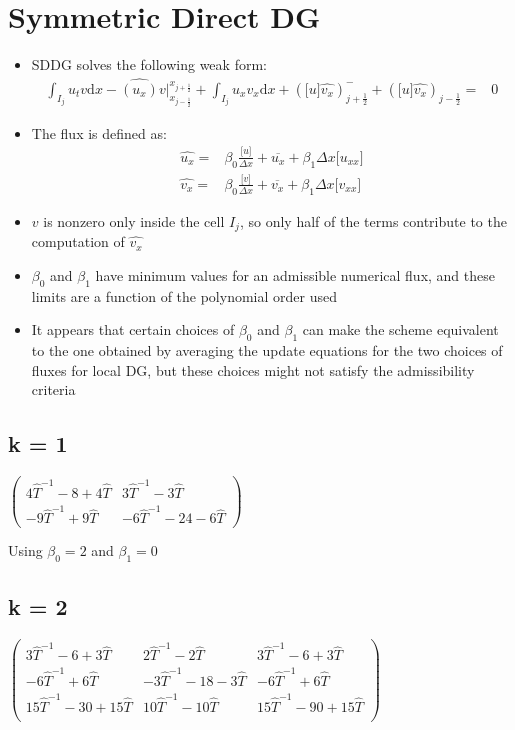 \documentclass[final]{siamltex}
\begin{document}
\section{Symmetric Direct DG}
\begin{itemize}
  \item SDDG solves the following weak form:
    \begin{align*}
      \int_{I_j} u_t v \mathrm{d}x -\widehat{(u_x)}v\bigr|_{x_{j-\frac{1}{2}}}^{x_{j+\frac{1}{2}}}+\int_{I_j} u_x v_x \mathrm{d}x+ (\lbrack u\rbrack\widehat{v_x})_{j+\frac{1}{2}}^- + (\lbrack u\rbrack \widehat{v_x} )_{j-\frac{1}{2}} = & 0
    \end{align*}
	\item The flux is defined as:
    \begin{align*}
      \widehat{u_x} = & \beta_0 \frac{\lbrack u \rbrack}{\Delta x} + \overline{u_x} + \beta_1 \Delta x \lbrack u_{xx} \rbrack\\
      \widehat{v_x} = & \beta_0 \frac{\lbrack v \rbrack}{\Delta x} + \overline{v_x} + \beta_1 \Delta x \lbrack v_{xx} \rbrack
    \end{align*}
  \item $v$ is nonzero only inside the cell $I_j$, so only half of the terms contribute to the computation of $\widehat{v_x}$
  \item $\beta_0$ and $\beta_1$ have minimum values for an admissible numerical flux, and these limits are a function of the polynomial order used
  \item It appears that certain choices of $\beta_0$ and $\beta_1$ can make the scheme equivalent to the one obtained by averaging the update equations for the two choices of fluxes for local DG, but these choices might not satisfy the admissibility criteria
\end{itemize}
  
\subsection{k = 1}
$\left(\begin{array}{cc}
4\hat{T}^{-1} -8+4 \hat{T} & 3\hat{T}^{-1}-3 \hat{T} \\
-9 \hat{T}^{-1} +9 \hat{T} & -6 \hat{T}^{-1} -24-6 \hat{T}
\end{array}\right)$

Using $\beta_0 = 2$ and $\beta_1 = 0$
    
\subsection{k = 2}
$\left(
\begin{array}{ccc}
 3 \hat{T}^{-1}-6+3 \hat{T} & 2 \hat{T}^{-1}-2 \hat{T} & 3 \hat{T}^{-1}-6+3 \hat{T} \\
 -6 \hat{T}^{-1}+6 \hat{T} & -3 \hat{T}^{-1}-18-3 \hat{T} & -6 \hat{T}^{-1}+6 \hat{T} \\
 15 \hat{T}^{-1}-30+15 \hat{T} & 10 \hat{T}^{-1}-10 \hat{T} & 15 \hat{T}^{-1}-90+15 \hat{T} \\
\end{array}
\right)$
\end{document}
